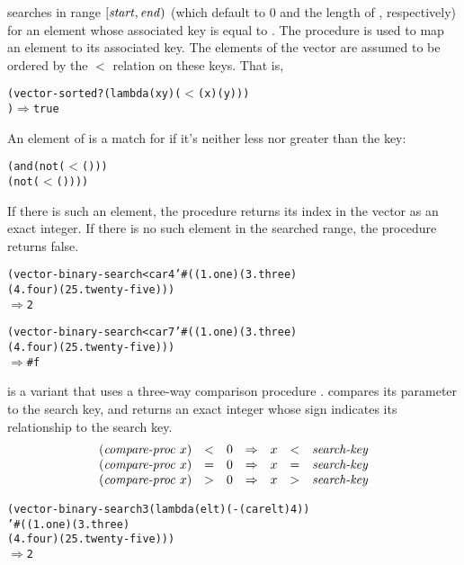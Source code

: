  searches  in range
\([\var{start},\var{end})\) (which default to 0 and the length of
, respectively) for an element whose
associated key is equal to . The procedure  is used to map
an element to its associated key. The elements of the vector are assumed
to be ordered by the $<$ relation on these keys. That is, 
%
\begin{alltt}
(vector-sorted? (lambda (x y) (\(<\) ( x) ( y)))
                  ) \(\Longrightarrow\) true
\end{alltt}
%
An element  of  is a match for  if it's
neither less nor greater than the key:
%
\begin{alltt}
(and (not (\(<\) ( ) ))
     (not (\(<\)  ( ))))
\end{alltt}
%
If there is such an element, the procedure returns its index in the
vector as an exact integer. If there is no such element in the searched 
range, the procedure returns false.
%
\begin{alltt}
(vector-binary-search < car 4 '#((1 . one) (3 . three)
                                 (4 . four) (25 . twenty-five)))
\(\Longrightarrow\) 2

(vector-binary-search < car 7 '#((1 . one) (3 . three)
                                 (4 . four) (25 . twenty-five)))
\(\Longrightarrow\) #f
\end{alltt}    
%
 is a variant that uses a three-way comparison
procedure .  compares its
parameter to the search key, and returns an
exact integer whose sign indicates its relationship to the search key.
%
\begin{displaymath}
  \begin{array}{rclcrcl}
      (\var{compare-proc}~x) &<& 0& \Rightarrow&  x &<& \var{search-key}\\
      (\var{compare-proc}~x) &=& 0& \Rightarrow&  x &=& \var{search-key}\\
      (\var{compare-proc}~x) &>& 0& \Rightarrow&  x &>& \var{search-key}
  \end{array}
\end{displaymath}
%
\begin{alltt}
(vector-binary-search3 (lambda (elt) (- (car elt) 4))
                       '#((1 . one) (3 . three)
                          (4 . four) (25 . twenty-five)))
\(\Longrightarrow\) 2
\end{alltt}
